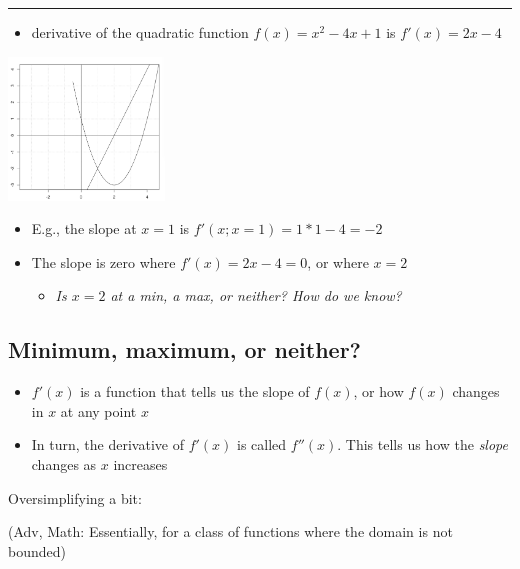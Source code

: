 \documentclass[]{article}
\providecommand{\tightlist}{%
  \setlength{\itemsep}{0pt}\setlength{\parskip}{0pt}}
\begin{document}
\begin{center}\rule{0.5\linewidth}{\linethickness}\end{center}

\begin{itemize}
\tightlist
\item
  derivative of the quadratic function \(f(x) = x^2 -4x + 1\) is
  \(f'(x) = 2x - 4\)
\end{itemize}

\includegraphics[height=1.5in]{picsfigs/plotaquadfncn_andderiv.png}

\begin{itemize}
\item
  E.g., the slope at \(x=1\) is \(f'(x;x=1) = 1*1 - 4 = -2\)
\item
  The slope is zero where \(f'(x)=2x-4=0\), or where \(x=2\)

  \begin{itemize}
  \tightlist
  \item
    \emph{Is \(x=2\) at a min, a max, or neither? How do we know?}
  \end{itemize}
\end{itemize}

\hypertarget{minimum-maximum-or-neither}{%
\subsection{Minimum, maximum, or
neither?}\label{minimum-maximum-or-neither}}

\begin{itemize}
\tightlist
\item
  \(f'(x)\) is a function that tells us the slope of \(f(x)\), or how
  \(f(x)\) changes in \(x\) at any point \(x\)
\item
  In turn, the derivative of \(f'(x)\) is called \(f''(x)\). This tells
  us how the \emph{slope} changes as \(x\) increases
\end{itemize}

\bigskip

Oversimplifying a bit:

\textcolor{RawSienna}{(Adv, Math: Essentially, for a class of functions where the domain is not bounded)}
\end{document}
